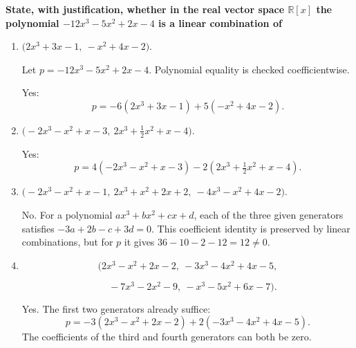 \providecommand{\rank}{\operatorname{r}}
\providecommand{\RR}{\mathbb R}
\providecommand{\CC}{\mathbb C}
\providecommand{\KK}{\mathbb K}

\setcounter{enumi}{66}
\item {\bfseries\boldmath
State, with justification, whether in the real vector space $\RR[x]$ the polynomial $-12x^3-5x^2+2x-4$ is a linear combination of
}

\begin{enumerate}[label=\alph*)]

\item $\bigl(2x^3+3x-1,\ -x^2+4x-2\bigr)$.

\begin{answer}
Let $p=-12x^3-5x^2+2x-4$. Polynomial equality is checked coefficientwise.

Yes:
\[
 p=-6(2x^3+3x-1)+5(-x^2+4x-2).
\]
\end{answer}

\item $\bigl(-2x^3-x^2+x-3,\ 2x^3+\frac12x^2+x-4\bigr)$.

\begin{answer}
Yes:
\[
 p=4(-2x^3-x^2+x-3)-2(2x^3+\tfrac12x^2+x-4).
\]
\end{answer}

\item $\bigl(-2x^3-x^2+x-1,\ 2x^3+x^2+2x+2,\ -4x^3-x^2+4x-2\bigr)$.

\begin{answer}
No. For a polynomial $ax^3+bx^2+cx+d$, each of the three given
generators satisfies $-3a+2b-c+3d=0$.
This coefficient identity is preserved by linear combinations, but for $p$
it gives $36-10-2-12=12\ne0$.
\end{answer}

\item
\[
\bigl(2x^3-x^2+2x-2,\ -3x^3-4x^2+4x-5,
\]

\[
\hspace{1em}-7x^3-2x^2-9,\ -x^3-5x^2+6x-7\bigr).
\]

\begin{answer}
Yes. The first two generators already suffice:
\[
 p=-3(2x^3-x^2+2x-2)+2(-3x^3-4x^2+4x-5).
\]
The coefficients of the third and fourth generators can both be zero.
\end{answer}
\end{enumerate}
